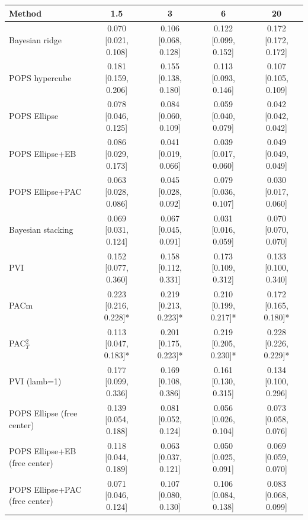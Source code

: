 \begin{tabular}{lcccc}
\toprule
Method & 1.5 & 3 & 6 & 20 \\
\midrule
Bayesian ridge & 0.070 {\scriptsize[0.021, 0.108]} & 0.106 {\scriptsize[0.068, 0.128]} & 0.122 {\scriptsize[0.099, 0.152]} & 0.172 {\scriptsize[0.172, 0.172]} \\
POPS hypercube & 0.181 {\scriptsize[0.159, 0.206]} & 0.155 {\scriptsize[0.138, 0.180]} & 0.113 {\scriptsize[0.093, 0.146]} & 0.107 {\scriptsize[0.105, 0.109]} \\
POPS Ellipse & 0.078 {\scriptsize[0.046, 0.125]} & 0.084 {\scriptsize[0.060, 0.109]} & 0.059 {\scriptsize[0.040, 0.079]} & 0.042 {\scriptsize[0.042, 0.042]} \\
POPS Ellipse+EB & 0.086 {\scriptsize[0.029, 0.173]} & 0.041 {\scriptsize[0.019, 0.066]} & 0.039 {\scriptsize[0.017, 0.060]} & 0.049 {\scriptsize[0.049, 0.049]} \\
POPS Ellipse+PAC & 0.063 {\scriptsize[0.028, 0.086]} & 0.045 {\scriptsize[0.028, 0.092]} & 0.079 {\scriptsize[0.036, 0.107]} & 0.030 {\scriptsize[0.017, 0.060]} \\
Bayesian stacking & 0.069 {\scriptsize[0.031, 0.124]} & 0.067 {\scriptsize[0.045, 0.091]} & 0.031 {\scriptsize[0.016, 0.059]} & 0.070 {\scriptsize[0.070, 0.070]} \\
PVI & 0.152 {\scriptsize[0.077, 0.360]} & 0.158 {\scriptsize[0.112, 0.331]} & 0.173 {\scriptsize[0.109, 0.312]} & 0.133 {\scriptsize[0.100, 0.340]} \\
PACm & 0.223 {\scriptsize[0.216, 0.228]}* & 0.219 {\scriptsize[0.213, 0.223]}* & 0.210 {\scriptsize[0.199, 0.217]}* & 0.172 {\scriptsize[0.165, 0.180]}* \\
PAC$^2_T$ & 0.113 {\scriptsize[0.047, 0.183]}* & 0.201 {\scriptsize[0.175, 0.223]}* & 0.219 {\scriptsize[0.205, 0.230]}* & 0.228 {\scriptsize[0.226, 0.229]}* \\
PVI (lamb=1) & 0.177 {\scriptsize[0.099, 0.336]} & 0.169 {\scriptsize[0.108, 0.386]} & 0.161 {\scriptsize[0.130, 0.315]} & 0.134 {\scriptsize[0.100, 0.296]} \\
POPS Ellipse (free center) & 0.139 {\scriptsize[0.054, 0.188]} & 0.081 {\scriptsize[0.052, 0.124]} & 0.056 {\scriptsize[0.026, 0.104]} & 0.073 {\scriptsize[0.058, 0.076]} \\
POPS Ellipse+EB (free center) & 0.118 {\scriptsize[0.044, 0.189]} & 0.063 {\scriptsize[0.037, 0.121]} & 0.050 {\scriptsize[0.025, 0.091]} & 0.069 {\scriptsize[0.059, 0.070]} \\
POPS Ellipse+PAC (free center) & 0.071 {\scriptsize[0.046, 0.124]} & 0.107 {\scriptsize[0.080, 0.130]} & 0.106 {\scriptsize[0.084, 0.138]} & 0.083 {\scriptsize[0.068, 0.099]} \\
\bottomrule
\end{tabular}

